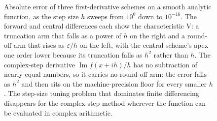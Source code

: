 \begin{figure}[ht]
\caption[Finite-difference and complex-step accuracy against step
size]{Absolute error of three first-derivative schemes on a smooth
analytic function, as the step size $h$ sweeps from $10^{0}$ down to
$10^{-16}$. The forward and central differences each show the
characteristic V: a truncation arm that falls as a power of $h$ on the
right and a round-off arm that rises as $\varepsilon/h$ on the left,
with the central scheme's apex one order lower because its truncation
falls as $h^{2}$ rather than $h$. The complex-step derivative
$\operatorname{Im} f(x + ih)/h$ has no subtraction of nearly equal
numbers, so it carries no round-off arm: the error falls as $h^{2}$
and then sits on the machine-precision floor for every smaller $h$.
The step-size tuning problem that dominates finite differencing
disappears for the complex-step method wherever the function can be
evaluated in complex arithmetic.}
\label{fig:vol02:ch05:complex-step}
\end{figure}
